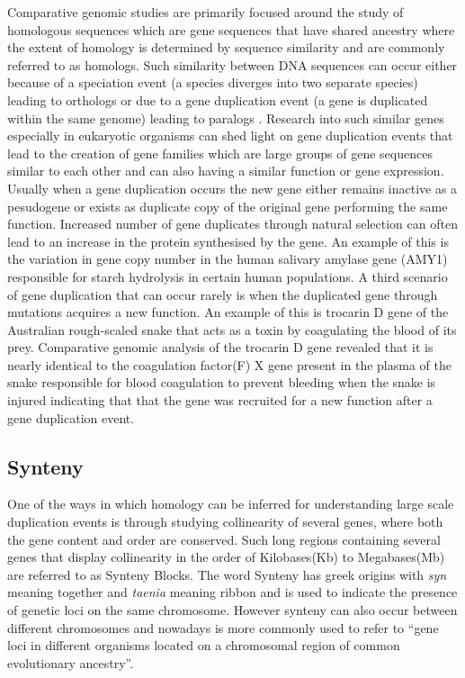 Comparative genomic studies are primarily focused around the study of homologous sequences which are gene sequences that have shared ancestry where the extent of homology is determined by sequence similarity and are commonly referred to as homologs. Such similarity between DNA sequences can occur either because of a speciation event (a species diverges into two separate species) leading to orthologs or due to a gene duplication event (a gene is duplicated within the same genome) leading to paralogs \cite{jensen2001orthologs}. Research into such similar genes especially in eukaryotic organisms can shed light on gene duplication events that lead to the creation of gene families which are large groups of gene sequences similar to each other and can also having a similar function or gene expression\cite{rubin2000comparative}. Usually when a gene duplication occurs the new gene either remains inactive as a pesudogene or exists as duplicate copy of the original gene performing the same function. Increased number of gene duplicates through natural selection can often lead to an increase in the protein synthesised by the gene. An example of this is the variation in gene copy number in the human salivary amylase gene (AMY1) responsible for starch hydrolysis in certain human populations\cite{perry2007diet}. A third scenario of gene duplication that can occur rarely is when the duplicated gene through mutations acquires a new function. An example of this is trocarin D gene of the Australian rough-scaled snake that acts as a toxin by coagulating the blood of its prey. Comparative genomic analysis of the trocarin D gene revealed that it is nearly identical to the coagulation factor(F) X gene present in the plasma of the snake responsible for blood coagulation to prevent bleeding when the snake is injured indicating that that the gene was recruited for a new function after a gene duplication event\cite{reza2007structure}.

\subsection{Synteny}
One of the ways in which homology can be inferred for understanding large scale duplication events is through studying collinearity of several genes, where both the gene content and order are conserved\cite{proost2011adhore}. Such long regions containing several genes that display collinearity in the order of Kilobases(Kb) to Megabases(Mb) are referred to as Synteny Blocks\cite{zeng2008orthocluster}. The word Synteny has greek origins with \textit{syn} meaning together and \textit{taenia} meaning ribbon and is used to indicate the presence of genetic loci on the same chromosome\cite{renwick1971mapping}. However synteny can also occur between different chromosomes and nowadays is more commonly  used to refer to ``gene loci in different organisms located on a chromosomal region of common evolutionary ancestry''\cite{passarge1999incorrect}.

